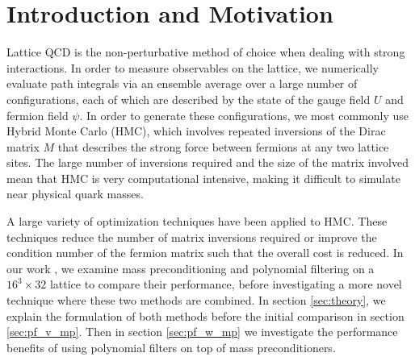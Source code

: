 \section{Introduction and Motivation} \label{sec:introduction}
Lattice QCD is the non-perturbative method of choice when dealing with strong interactions.
In order to measure observables on the lattice, we numerically evaluate path integrals via an ensemble average over a large number of configurations, each of which are described by the state of the gauge field $U$ and fermion field $\psi$.
In order to generate these configurations, we most commonly use Hybrid Monte Carlo (HMC), which involves repeated inversions of the Dirac matrix $M$ that describes the strong force between fermions at any two lattice sites.
The large number of inversions required and the size of the matrix involved mean that HMC is very computational intensive, making it difficult to simulate near physical quark masses.

A large variety of optimization techniques have been applied to HMC.
These techniques reduce the number of matrix inversions required or improve the condition number of the fermion matrix such that the overall cost is reduced.
In our work \cite{Haar:2016bwe}, we examine mass preconditioning \cite{Hasenbusch:2003} and polynomial filtering \cite{Kamleh:2011dc} on a $16^3 \times 32$ lattice to compare their performance, before investigating a more novel technique where these two methods are combined.
In section \ref{sec:theory}, we explain the formulation of both methods before the initial comparison in section \ref{sec:pf_v_mp}. Then in section \ref{sec:pf_w_mp} we investigate the performance benefits of using polynomial filters on top of mass preconditioners.



